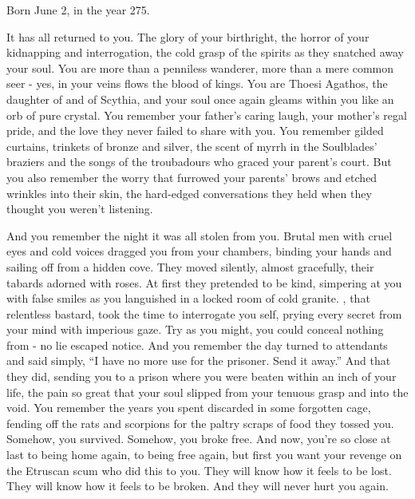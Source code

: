 \documentclass[blue]{Kos}
\begin{document}
\name{\bThoesi{}}

Born June 2, in the year 275.

It has all returned to you. The glory of your birthright, the horror of your kidnapping and interrogation, the cold grasp of the spirits as they snatched away your soul. You are more than a penniless wanderer, more than a mere common seer - yes, in your veins flows the blood of kings. You are Thoesi Agathos, the daughter of \cScythiaKing{\Monarch} \cScythiaKing{} and \cScythiaQueen{\Monarch} \cScythiaQueen{} of Scythia, and your soul once again gleams within you like an orb of pure crystal. You remember your father’s caring laugh, your mother's regal pride, and the love they never failed to share with you. You remember gilded curtains, trinkets of bronze and silver, the scent of myrrh in the Soulblades' braziers and the songs of the troubadours who graced your parent's court. But you also remember the worry that furrowed your parents' brows and etched wrinkles into their skin, the hard-edged conversations they held when they thought you weren't listening. 

And you remember the night it was all stolen from you. Brutal men with cruel eyes and cold voices dragged you from your chambers, binding your hands and sailing off from a hidden cove. They moved silently, almost gracefully, their tabards adorned with roses. At first they pretended to be kind, simpering at you with false smiles as you languished in a locked room of cold granite. \cEtruriaKing{\Monarch} \cEtruriaKing{}, that relentless bastard, took the time to interrogate you \cEtruriaKing{\them}self, prying every secret from your mind with \cEtruriaKing{\their} imperious gaze. Try as you might, you could conceal nothing from \cEtruriaKing{\them} - no lie escaped \cEtruriaKing{\their} notice. And you remember the day \cEtruriaKing{\they} turned to \cEtruriaKing{\their} attendants and said simply, ``I have no more use for the prisoner. Send it away.'' And that they did, sending you to a prison where you were beaten within an inch of your life, the pain so great that your soul slipped from your tenuous grasp and into the void. You remember the years you spent discarded in some forgotten cage, fending off the rats and scorpions for the paltry scraps of food they tossed you. Somehow, you survived. Somehow, you broke free. And now, you’re so close at last to being home again, to being free again, but first you want your revenge on the Etruscan scum who did this to you. They will know how it feels to be lost. They will know how it feels to be broken. And they will never hurt you again.
\end{document}
